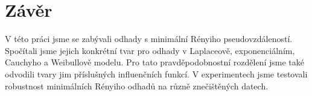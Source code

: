  \chapter*{Závěr}
 
 V této práci jsme se zabývali odhady s minimální Rényiho pseudovzdáleností. Spočítali jsme jejich konkrétní tvar pro odhady v Laplaceově, exponenciálním, Cauchyho a Weibullově modelu. Pro tato pravděpodobnostní rozdělení jsme také odvodili tvary jim příslušných influenčních funkcí. V experimentech jsme testovali robustnost minimálních Rényiho odhadů na různě znečištěných datech. 